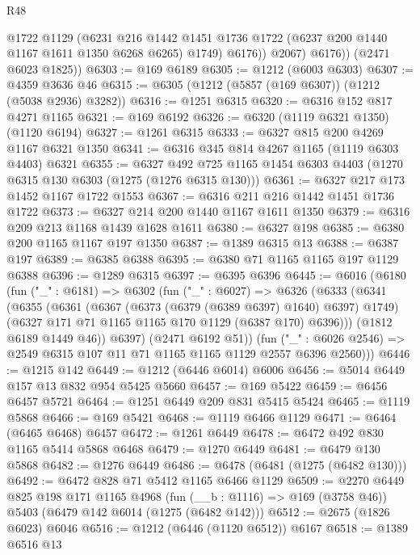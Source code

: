 \begin{lexlean}{R48}
\begin{coremodule}
                @1722
                @1129
                (@6231
                  @216
                  @1442
                  @1451
                  @1736
                  @1722
                  (@6237 @200 @1440 @1167 @1611 @1350 @6268 @6265)
                  @1749)
                @6176))
            @2067)
          @6176))
      (@2471 @6023 @1825))
@6303 := @169 @6189
@6305 := @1212 (@6003 @6303)
@6307 := @4359 @3636 @46
@6315 := @6305 (@1212 (@5857 (@169 @6307)) (@1212 (@5038 @2936) @3282))
@6316 := @1251 @6315
@6320 := @6316 @152 @817 @4271 @1165
@6321 := @169 @6192
@6326 := @6320 (@1119 @6321 @1350) (@1120 @6194)
@6327 := @1261 @6315
@6333 := @6327 @815 @200 @4269 @1167 @6321 @1350
@6341 := @6316 @345 @814 @4267 @1165 (@1119 @6303 @4403) @6321
@6355 := @6327 @492 @725 @1165 @1454 @6303 @4403 (@1270 @6315 @130 @6303 (@1275 (@1276 @6315 @130)))
@6361 := @6327 @217 @173 @1452 @1167 @1722 @1553
@6367 := @6316 @211 @216 @1442 @1451 @1736 @1722
@6373 := @6327 @214 @200 @1440 @1167 @1611 @1350
@6379 := @6316 @209 @213 @1168 @1439 @1628 @1611
@6380 := @6327 @198
@6385 := @6380 @200 @1165 @1167 @197 @1350
@6387 := @1389 @6315 @13
@6388 := @6387 @197
@6389 := @6385 @6388
@6395 := @6380 @71 @1165 @1165 @197 @1129 @6388
@6396 := @1289 @6315
@6397 := @6395 @6396
@6445 := @6016
    (@6180
      (fun ("_" : @6181) =>
      @6302
        (fun ("_" : @6027) =>
        @6326
          (@6333
            (@6341
              (@6355
                (@6361
                  (@6367 (@6373 (@6379 (@6389 @6397) @1640) @6397) @1749)
                  (@6327 @171 @71 @1165 @1165 @170 @1129 (@6387 @170) @6396)))
              (@1812 @6189 @1449 @46))
            @6397)
          (@2471 @6192 @51))
        (fun ("_" : @6026 @2546) => @2549 @6315 @107 @11 @71 @1165 @1165 @1129 @2557 @6396 @2560)))
@6446 := @1215 @142
@6449 := @1212 (@6446 @6014) @6006
@6456 := @5014 @6449 @157 @13 @832 @954 @5425 @5660
@6457 := @169 @5422
@6459 := @6456 @6457 @5721
@6464 := @1251 @6449 @209 @831 @5415 @5424
@6465 := @1119 @5868
@6466 := @169 @5421
@6468 := @1119 @6466 @1129
@6471 := @6464 (@6465 @6468) @6457
@6472 := @1261 @6449
@6478 := @6472 @492 @830 @1165 @5414 @5868 @6468
@6479 := @1270 @6449
@6481 := @6479 @130 @5868
@6482 := @1276 @6449
@6486 := @6478 (@6481 (@1275 (@6482 @130)))
@6492 := @6472 @828 @71 @5412 @1165 @6466 @1129
@6509 := @2270
    @6449
    @825
    @198
    @171
    @1165
    @4968
    (fun (__b : @1116) => @169 (@3758 @46))
    @5403
    (@6479 @142 @6014 (@1275 (@6482 @142)))
@6512 := @2675 (@1826 @6023) @6046
@6516 := @1212 (@6446 (@1120 @6512)) @6167
@6518 := @1389 @6516 @13

\end{coremodule}
\end{lexlean}

